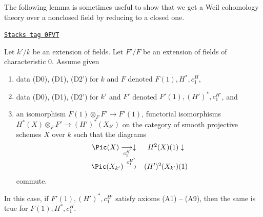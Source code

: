 The following lemma is sometimes useful to show that we get a
Weil cohomology theory over a nonclosed field by reducing to a
closed one.

\begin{lemma}
\label{weil-lemma-check-over-extension}
\href{https://stacks.math.columbia.edu/tag/0FVT}{\texttt{Stacks tag 0FVT}}

Let $k'/k$ be an extension of fields. Let $F'/F$ be an extension
of fields of characteristic $0$. Assume given
\begin{enumerate}
\item data (D0), (D1), (D2') for $k$ and $F$ denoted
$F(1), H^*, c_1^H$,
\item data (D0), (D1), (D2') for $k'$ and $F'$ denoted
$F'(1), (H')^*, c_1^{H'}$, and
\item an isomorphism $F(1) \otimes_F F' \to F'(1)$, functorial isomorphisms
$H^*(X) \otimes_F F' \to (H')^*(X_{k'})$ on the category of smooth projective
schemes $X$ over $k$ such that the diagrams
$$
\begin{array}{cc}\Pic(X) \underset{c_1^H}{\longrightarrow}\downarrow & H^2(X)(1) \downarrow \\ \Pic(X_{k'}) \overset{c_1^{H'}}{\longrightarrow} & (H')^2(X_{k'})(1)\end{array}
$$
commute.
\end{enumerate}
In this case, if $F'(1), (H')^*, c_1^{H'}$ satisfy axioms (A1) -- (A9),
then the same is true for $F(1), H^*, c_1^H$.
\end{lemma}


